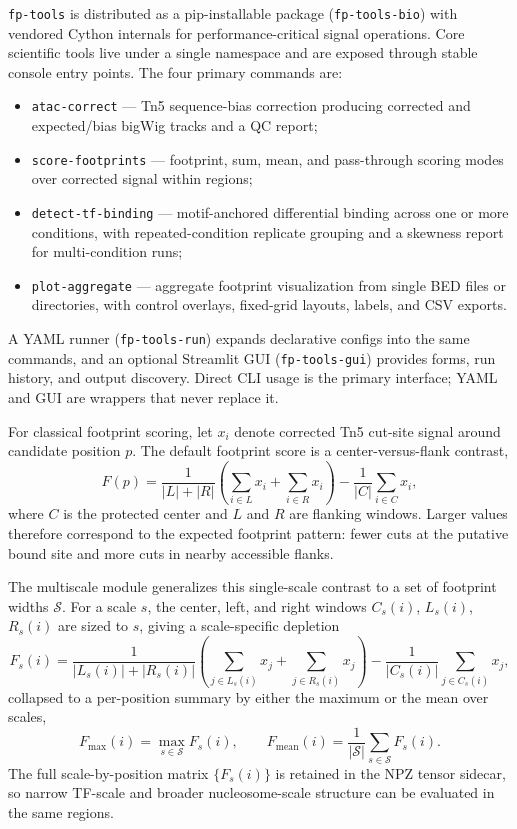\documentclass[biomedinformatics,article,submit,pdftex,moreauthors]{Definitions/mdpi}
\begin{document}
\texttt{fp-tools} is distributed as a pip-installable package (\texttt{fp-tools-bio})
with vendored Cython internals for performance-critical signal operations. Core
scientific tools live under a single namespace and are exposed through stable
console entry points. The four primary commands are:
\begin{itemize}
  \item \texttt{atac-correct} --- Tn5 sequence-bias correction producing corrected
        and expected/bias bigWig tracks and a QC report;
  \item \texttt{score-footprints} --- footprint, sum, mean, and pass-through
        scoring modes over corrected signal within regions;
  \item \texttt{detect-tf-binding} --- motif-anchored differential binding across
        one or more conditions, with repeated-condition replicate grouping and a
        skewness report for multi-condition runs;
  \item \texttt{plot-aggregate} --- aggregate footprint visualization from single
        BED files or directories, with control overlays, fixed-grid layouts,
        labels, and CSV exports.
\end{itemize}
A YAML runner (\texttt{fp-tools-run}) expands declarative configs
into the same commands, and an optional Streamlit GUI (\texttt{fp-tools-gui})
provides forms, run history, and output discovery. Direct CLI usage is the primary
interface; YAML and GUI are wrappers that never replace it.

For classical footprint scoring, let $x_i$ denote corrected Tn5 cut-site signal
around candidate position $p$. The default footprint score is a center-versus-flank
contrast,
\[
F(p)=\frac{1}{|L|+|R|}\left(\sum_{i\in L}x_i+\sum_{i\in R}x_i\right)-
\frac{1}{|C|}\sum_{i\in C}x_i,
\]
where $C$ is the protected center and $L$ and $R$ are flanking windows. Larger
values therefore correspond to the expected footprint pattern: fewer cuts at the
putative bound site and more cuts in nearby accessible flanks.

The multiscale module generalizes this single-scale contrast to a set of footprint
widths $\mathcal{S}$. For a scale $s$, the center, left, and right windows
$C_s(i)$, $L_s(i)$, $R_s(i)$ are sized to $s$, giving a scale-specific depletion
\[
F_s(i)=\frac{1}{|L_s(i)|+|R_s(i)|}\left(\sum_{j\in L_s(i)}x_j+\sum_{j\in R_s(i)}x_j\right)-
\frac{1}{|C_s(i)|}\sum_{j\in C_s(i)}x_j,
\]
collapsed to a per-position summary by either the maximum or the mean over scales,
\[
F_{\max}(i)=\max_{s\in\mathcal{S}}F_s(i),\qquad
F_{\mathrm{mean}}(i)=\frac{1}{|\mathcal{S}|}\sum_{s\in\mathcal{S}}F_s(i).
\]
The full scale-by-position matrix $\{F_s(i)\}$ is retained in the NPZ tensor
sidecar, so narrow TF-scale and broader nucleosome-scale structure can be
evaluated in the same regions.
\end{document}
